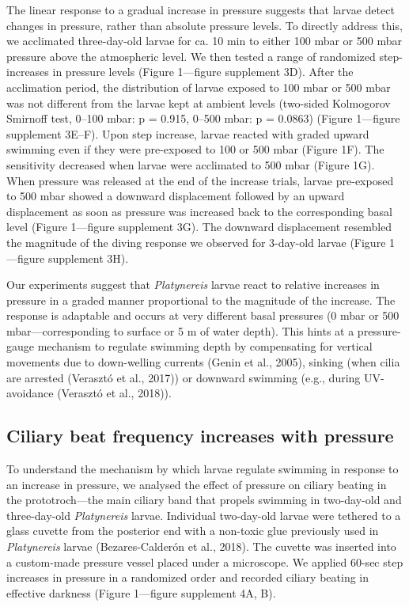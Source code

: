 \documentclass[
  11pt,
]{article}
\begin{document}
The linear response to a gradual increase in pressure suggests that
larvae detect changes in pressure, rather than absolute pressure levels.
To directly address this, we acclimated three-day-old larvae for ca. 10
min to either 100 mbar or 500 mbar pressure above the atmospheric level.
We then tested a range of randomized step-increases in pressure levels
(Figure 1---figure supplement 3D). After the acclimation period, the
distribution of larvae exposed to 100 mbar or 500 mbar was not different
from the larvae kept at ambient levels (two-sided Kolmogorov Smirnoff
test, 0--100 mbar: p = 0.915, 0--500 mbar: p = 0.0863) (Figure
1---figure supplement 3E--F). Upon step increase, larvae reacted with
graded upward swimming even if they were pre-exposed to 100 or 500 mbar
(Figure 1F). The sensitivity decreased when larvae were acclimated to
500 mbar (Figure 1G). When pressure was released at the end of the
increase trials, larvae pre-exposed to 500 mbar showed a downward
displacement followed by an upward displacement as soon as pressure was
increased back to the corresponding basal level (Figure 1---figure
supplement 3G). The downward displacement resembled the magnitude of the
diving response we observed for 3-day-old larvae (Figure 1---figure
supplement 3H).

Our experiments suggest that \emph{Platynereis} larvae react to relative
increases in pressure in a graded manner proportional to the magnitude
of the increase. The response is adaptable and occurs at very different
basal pressures (0 mbar or 500 mbar---corresponding to surface or 5 m of
water depth). This hints at a pressure-gauge mechanism to regulate
swimming depth by compensating for vertical movements due to
down-welling currents (Genin et al., 2005), sinking (when cilia are
arrested (Verasztó et al., 2017)) or downward swimming (e.g., during
UV-avoidance (Verasztó et al., 2018)).

\subsection{Ciliary beat frequency increases with
pressure}\label{ciliary-beat-frequency-increases-with-pressure}

To understand the mechanism by which larvae regulate swimming in
response to an increase in pressure, we analysed the effect of pressure
on ciliary beating in the prototroch---the main ciliary band that
propels swimming in two-day-old and three-day-old \emph{Platynereis}
larvae. Individual two-day-old larvae were tethered to a glass cuvette
from the posterior end with a non-toxic glue previously used in
\emph{Platynereis} larvae (Bezares-Calderón et al., 2018). The cuvette
was inserted into a custom-made pressure vessel placed under a
microscope. We applied 60-sec step increases in pressure in a randomized
order and recorded ciliary beating in effective darkness (Figure
1---figure supplement 4A, B).
\end{document}
